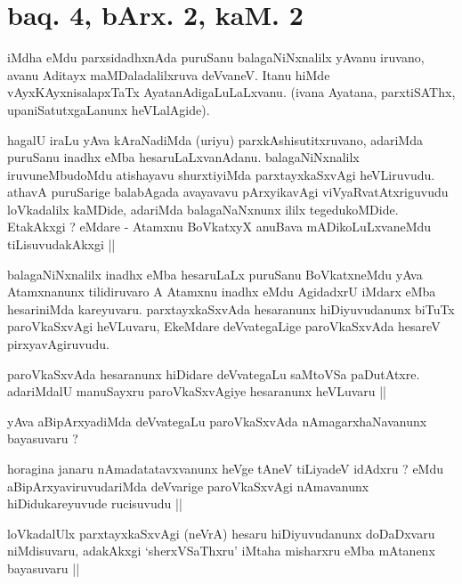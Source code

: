 \section*{baq. 4, bArx. 2, kaM. 2}


\begin{artha}
iMdha eMdu parxsidadhxnAda puruSanu balagaNiNxnalilx yAvanu iruvano, avanu Aditayx maMDaladalilxruva deVvaneV. Itanu hiMde vAyxKAyxnisalapxTaTx AyatanAdigaLuLaLxvanu. (ivana Ayatana, parxtiSAThx, upaniSatutxgaLanunx heVLalAgide).
\end{artha}

\begin{artha}
hagalU iraLu yAva kAraNadiMda (uriyu) parxkAshisutitxruvano, adariMda puruSanu inadhx eMba hesaruLaLxvanAdanu. balagaNiNxnalilx iruvuneMbudoMdu atishayavu shurxtiyiMda parxtayxkaSxvAgi heVLiruvudu. athavA puruSarige balabAgada avayavavu pArxyikavAgi viVyaRvatAtxriguvudu loVkadalilx kaMDide, adariMda balagaNaNxnunx ililx tegedukoMDide. EtakAkxgi ? eMdare - Atamxnu BoVkatxyX anuBava mADikoLuLxvaneMdu tiLisuvudakAkxgi ||
\end{artha}

\begin{artha}
balagaNiNxnalilx inadhx eMba hesaruLaLx puruSanu BoVkatxneMdu yAva Atamxnanunx tilidiruvaro A Atamxnu inadhx eMdu AgidadxrU iMdarx eMba hesariniMda kareyuvaru. parxtayxkaSxvAda hesaranunx hiDiyuvudanunx biTuTx paroVkaSxvAgi heVLuvaru, EkeMdare deVvategaLige paroVkaSxvAda hesareV pirxyavAgiruvudu.
\end{artha}

\begin{artha}
paroVkaSxvAda hesaranunx hiDidare deVvategaLu saMtoVSa paDutAtxre. adariMdalU manuSayxru paroVkaSxvAgiye hesaranunx heVLuvaru ||
\end{artha}

\begin{artha}
yAva aBipArxyadiMda deVvategaLu paroVkaSxvAda nAmagarxhaNavanunx bayasuvaru ?
\end{artha}

\begin{artha}
horagina janaru nAmadatatavxvanunx heVge tAneV tiLiyadeV idAdxru ? eMdu aBipArxyaviruvudariMda deVvarige paroVkaSxvAgi nAmavanunx hiDidukareyuvude rucisuvudu ||
\end{artha}


\begin{artha}
loVkadalUlx parxtayxkaSxvAgi (neVrA) hesaru hiDiyuvudanunx doDaDxvaru niMdisuvaru, adakAkxgi `sherxVSaThxru' iMtaha misharxru eMba mAtanenx bayasuvaru ||
\end{artha}

